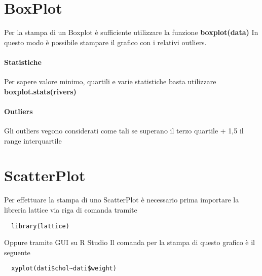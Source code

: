 \documentclass[12pt, a4paper, openany]{book}
\begin{document}
\section{BoxPlot}
Per la stampa di un Boxplot è sufficiente utilizzare la funzione \textbf{boxplot(data)}
In questo modo è possibile stampare il grafico con i relativi outliers.
\paragraph{Statistiche} Per sapere valore minimo, quartili e varie statistiche basta utilizzare
\textbf{boxplot.stats(rivers)}
\paragraph{Outliers} Gli outliers vegono considerati come tali se superano il terzo quartile
+ 1,5 il range interquartile

\section{ScatterPlot}
Per effettuare la stampa di uno ScatterPlot è necessario prima importare la libreria
lattice via riga di comanda tramite
\begin{lstlisting}
  library(lattice)
\end{lstlisting}
Oppure tramite GUI su R Studio
Il comanda per la stampa di questo grafico è il seguente
\begin{lstlisting}
  xyplot(dati$chol~dati$weight)
\end{lstlisting}
\end{document}
